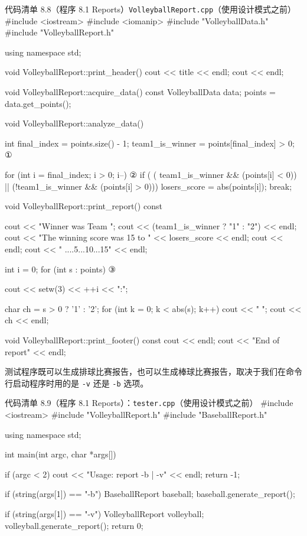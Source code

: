 \begin{codeboxt}{代码清单 8.8（程序 8.1 Reports）\texttt{Volleyball\allowbreak{}Report.\allowbreak{}cpp}（使用设计模式之前）}
#include <iostream>
#include <iomanip>
#include "VolleyballData.h"
#include "VolleyballReport.h"

using namespace std;

void VolleyballReport::print_header()
{
    cout << title << endl;
    cout << endl;
}

void VolleyballReport::acquire_data() const
{
    VolleyballData data;
    points = data.get_points();
}

void VolleyballReport::analyze_data()
{
    int final_index = points.size() - 1;
    team1_is_winner = points[final_index] > 0; ①

    for (int i = final_index; i > 0; i--)      ②
    {
        if (   ( team1_is_winner && (points[i] < 0))
            || (!team1_is_winner && (points[i] > 0)))
        {
            losers_score = abs(points[i]);
            break;
        }
    }
}

void VolleyballReport::print_report() const
{
    cout << "Winner was Team ";
    cout << (team1_is_winner ? "1" : "2") << endl;
    cout << "The winning score was 15 to " << losers_score << endl;
    cout << endl;
    cout << "     ....5...10...15" << endl;

    int i = 0;
    for (int s : points)                       ③
    {
        cout << setw(3) << ++i << ":";

        char ch = s > 0 ? '1' : '2';
        for (int k = 0; k < abs(s); k++) cout << " ";
        cout << ch << endl;
    }
}

void VolleyballReport::print_footer() const
{
    cout << endl;
    cout << "End of report" << endl;
}
\end{codeboxt}
\par
{}\par
{}\par

测试程序既可以生成排球比赛报告，也可以生成棒球比赛报告，取决于我们在命令行启动程序时用的是 \texttt{-v} 还是 \texttt{-b} 选项。

\begin{codeboxt}{代码清单 8.9（程序 8.1 Reports）：\texttt{tester.\allowbreak{}cpp}（使用设计模式之前）}
#include <iostream>
#include "VolleyballReport.h"
#include "BaseballReport.h"

using namespace std;

int main(int argc, char *args[])
{
    if (argc < 2)
    {
        cout << "Usage: report -b | -v" << endl;
        return -1;
    }

    if (string(args[1]) == "-b")
    {
        BaseballReport baseball;
        baseball.generate_report();
    }

    if (string(args[1]) == "-v")
    {
        VolleyballReport volleyball;
        volleyball.generate_report();
    }
    return 0;
}
\end{codeboxt}

